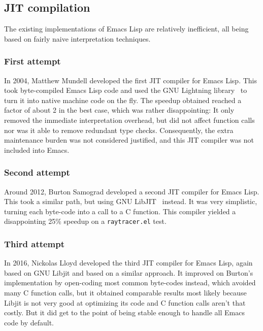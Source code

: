 \documentclass[format=acmsmall, review]{acmart}
\newcommand \Elisp {Emacs Lisp}
\begin{document}
\subsection{JIT compilation}
\label{sec:jit}

The existing implementations of \Elisp{} are relatively inefficient, all
being based on fairly naive interpretation techniques.

\subsubsection{First attempt}
In 2004, Matthew Mundell developed the first JIT compiler for \Elisp.
This took byte-compiled \Elisp{} code and used the GNU Lightning
library~\cite{GNULightning} to turn it into native machine code on the
fly.  The speedup obtained reached a factor of about 2 in the best
case, which was rather disappointing: It only removed the immediate
interpretation overhead, but did not affect function calls nor was it
able to remove redundant type checks.  Consequently, the extra
maintenance burden was not considered justified, and this JIT compiler
was not included into Emacs.

\subsubsection{Second attempt}
Around 2012, Burton Samograd developed a second JIT compiler for \Elisp.
This took a similar path, but using GNU LibJIT~\cite{GNULibjit} instead.
It was very simplistic, turning each byte-code into a call to a C function.
This compiler yielded a disappointing 25\% speedup on
a \texttt{raytracer.el} test.

\subsubsection{Third attempt}
In 2016, Nickolas Lloyd developed the third JIT compiler for \Elisp, again
based on GNU Libjit and based on a similar approach.  It improved on
Burton's implementation by open-coding most common byte-codes instead, which
avoided many C function calls, but it obtained comparable results most
likely because Libjit is not very good at optimizing its code and C function
calls aren't that costly.  But it did get to the point of being stable enough
to handle all Emacs code by default.
\end{document}
